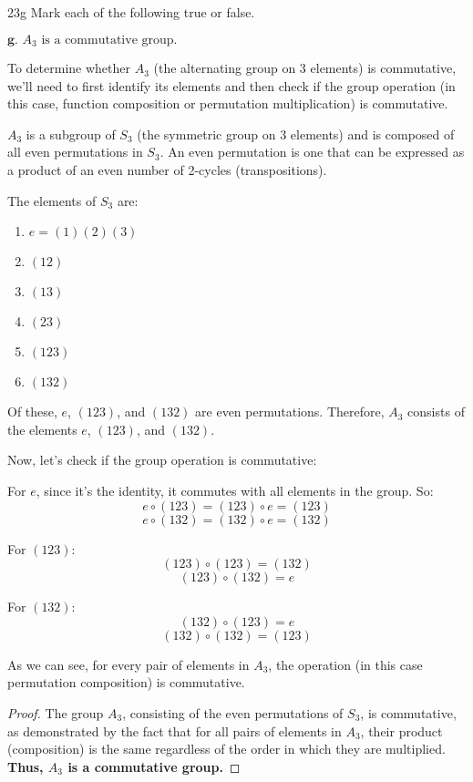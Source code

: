 \documentclass[12pt]{amsart}
\theoremstyle{definition}
\numberwithin{equation}{section}
\theoremstyle{plain}
\begin{document}
\begin{exercise}{23g} Mark each of the following true or false.

    \(\textbf{g. } A_3 \text{ is a commutative group.}\)

        To determine whether \( A_3 \) (the alternating group on 3 elements) is commutative, we'll need to first identify its elements and then check if the group operation (in this case, function composition or permutation multiplication) is commutative.

\( A_3 \) is a subgroup of \( S_3 \) (the symmetric group on 3 elements) and is composed of all even permutations in \( S_3 \). An even permutation is one that can be expressed as a product of an even number of 2-cycles (transpositions).

The elements of \( S_3 \) are:
\begin{enumerate}
    \item \( e = (1)(2)(3) \)
    \item \( (12) \)
    \item \( (13) \)
    \item \( (23) \)
    \item \( (123) \)
    \item \( (132) \)
\end{enumerate}

Of these, \( e \), \( (123) \), and \( (132) \) are even permutations. Therefore, \( A_3 \) consists of the elements \( e \), \( (123) \), and \( (132) \).

Now, let's check if the group operation is commutative:

For \( e \), since it's the identity, it commutes with all elements in the group. So:
\[ e \circ (123) = (123) \circ e = (123) \]
\[ e \circ (132) = (132) \circ e = (132) \]

For \( (123) \):
\[ (123) \circ (123) = (132) \]
\[ (123) \circ (132) = e \]

For \( (132) \):
\[ (132) \circ (123) = e \]
\[ (132) \circ (132) = (123) \]

As we can see, for every pair of elements in \( A_3 \), the operation (in this case permutation composition) is commutative. 

\begin{proof}
The group \( A_3 \), consisting of the even permutations of \( S_3 \), is commutative, as demonstrated by the fact that for all pairs of elements in \( A_3 \), their product (composition) is the same regardless of the order in which they are multiplied. \textbf{Thus, \( A_3 \) is a commutative group.}
\end{proof}
    
\end{exercise}
\vspace*{20pt}
\end{document}
